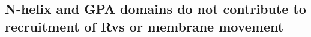 \documentclass[9pt,lineno]{elife}
\begin{document}

\subsection{N-helix and GPA domains do not contribute to recruitment of Rvs or membrane movement}
\lipsum[12]
	
\end{document}
